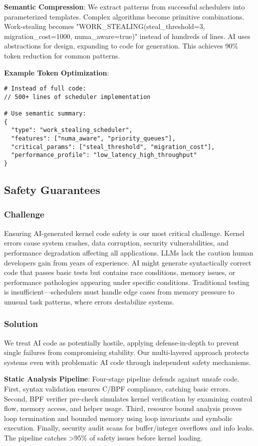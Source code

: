 \textbf{Semantic Compression}: We extract patterns from successful schedulers into parameterized templates. Complex algorithms become primitive combinations. Work-stealing becomes "WORK\_STEALING(steal\_threshold=3, migration\_cost=1000, numa\_aware=true)" instead of hundreds of lines. AI uses abstractions for design, expanding to code for generation. This achieves 90\% token reduction for common patterns.

\textbf{Example Token Optimization}:
\begin{verbatim}
# Instead of full code:
// 500+ lines of scheduler implementation

# Use semantic summary:
{
  "type": "work_stealing_scheduler",
  "features": ["numa_aware", "priority_queues"],
  "critical_params": ["steal_threshold", "migration_cost"],
  "performance_profile": "low_latency_high_throughput"
}
\end{verbatim}

\subsection{Safety Guarantees}

\subsubsection{Challenge}
Ensuring AI-generated kernel code safety is our most critical challenge. Kernel errors cause system crashes, data corruption, security vulnerabilities, and performance degradation affecting all applications. LLMs lack the caution human developers gain from years of experience. AI might generate syntactically correct code that passes basic tests but contains race conditions, memory issues, or performance pathologies appearing under specific conditions. Traditional testing is insufficient—schedulers must handle edge cases from memory pressure to unusual task patterns, where errors destabilize systems.

\subsubsection{Solution}
We treat AI code as potentially hostile, applying defense-in-depth to prevent single failures from compromising stability. Our multi-layered approach protects systems even with problematic AI code through independent safety mechanisms.

\textbf{Static Analysis Pipeline}: Four-stage pipeline defends against unsafe code. First, syntax validation ensures C/BPF compliance, catching basic errors. Second, BPF verifier pre-check simulates kernel verification by examining control flow, memory access, and helper usage. Third, resource bound analysis proves loop termination and bounded memory using loop invariants and symbolic execution. Finally, security audit scans for buffer/integer overflows and info leaks. The pipeline catches >95\% of safety issues before kernel loading.

